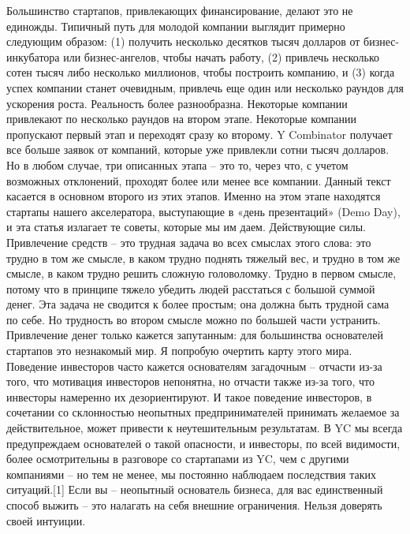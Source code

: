\documentclass[ebook,12pt,oneside,openany]{memoir}
\date{}
\begin{document}
\maketitle

Большинство стартапов, привлекающих финансирование, делают это не
единожды. Типичный путь для молодой компании выглядит примерно
следующим образом: (1) получить несколько десятков тысяч долларов от
бизнес-инкубатора или бизнес-ангелов, чтобы начать работу, (2)
привлечь несколько сотен тысяч либо несколько миллионов, чтобы
построить компанию, и (3) когда успех компании станет очевидным,
привлечь еще один или несколько раундов для ускорения роста.
Реальность более разнообразна. Некоторые компании привлекают по
несколько раундов на втором этапе. Некоторые компании пропускают
первый этап и переходят сразу ко второму. Y Combinator получает все
больше заявок от компаний, которые уже привлекли сотни тысяч долларов.
Но в любом случае, три описанных этапа – это то, через что, с учетом
возможных отклонений, проходят более или менее все компании. Данный
текст касается в основном второго из этих этапов. Именно на этом этапе
находятся стартапы нашего акселератора, выступающие в «день
презентаций» (Demo Day), и эта статья излагает те советы, которые мы
им даем. Действующие силы. Привлечение средств – это трудная задача во
всех смыслах этого слова: это трудно в том же смысле, в каком трудно
поднять тяжелый вес, и трудно в том же смысле, в каком трудно решить
сложную головоломку. Трудно в первом смысле, потому что в принципе
тяжело убедить людей расстаться с большой суммой денег. Эта задача не
сводится к более простым; она должна быть трудной сама по себе. Но
трудность во втором смысле можно по большей части устранить.
Привлечение денег только кажется запутанным: для большинства
основателей стартапов это незнакомый мир. Я попробую очертить карту
этого мира. Поведение инвесторов часто кажется основателям загадочным
– отчасти из-за того, что мотивация инвесторов непонятна, но отчасти
также из-за того, что инвесторы намеренно их дезориентируют. И такое
поведение инвесторов, в сочетании со склонностью неопытных
предпринимателей принимать желаемое за действительное, может привести
к неутешительным результатам. В YC мы всегда предупреждаем основателей
о такой опасности, и инвесторы, по всей видимости, более осмотрительны
в разговоре со стартапами из YC, чем с другими компаниями – но тем не
менее, мы постоянно наблюдаем последствия таких ситуаций.[1] Если вы –
неопытный основатель бизнеса, для вас единственный способ выжить – это
налагать на себя внешние ограничения. Нельзя доверять своей интуиции.
\end{document}
